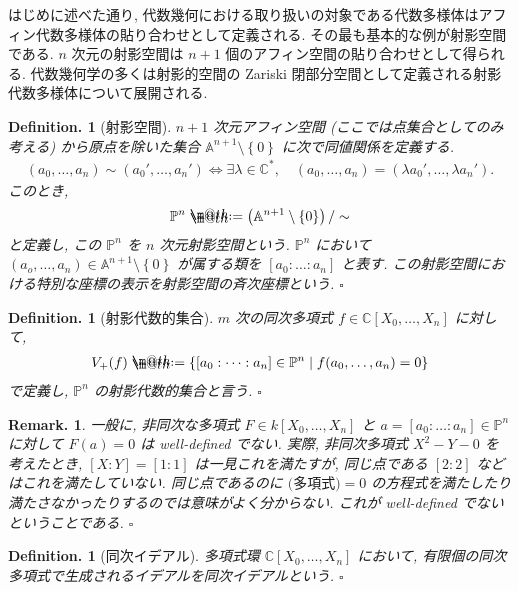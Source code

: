 \documentclass[openany, a4paper, oneside]{jsbook}
\makeatletter
\newcommand*{\defeq}{\mathrel{\rlap{%
\raisebox{0.3ex}{$\m@th\cdot$}}%
\raisebox{-0.3ex}{$\m@th\cdot$}}%
=}
\theoremstyle{break}
\theoremstyle{breakdefn}
\newtheorem{defn}[thm]{Definition.}
\newtheorem{rem}[thm]{Remark.}
\newcommand{\rbk}[1]{\left (#1\right)}
\newcommand{\cbk}[1]{\left\{#1\right\}}
\newcommand{\relmiddle}[1]{\mathrel{}\middle#1\mathrel{}}
\newcommand{\set}[2]{\left\{#1 \relmiddle| #2\right\}}
\newcommand{\fin}{\hfill $\square$ \par}
\makeatother
\begin{document}
はじめに述べた通り, 代数幾何における取り扱いの対象である代数多様体はアフィン代数多様体の貼り合わせとして定義される.
その最も基本的な例が射影空間である.
$n$ 次元の射影空間は $n+1$ 個のアフィン空間の貼り合わせとして得られる.
代数幾何学の多くは射影的空間の Zariski 閉部分空間として定義される射影代数多様体について展開される.
\begin{defn}[射影空間]\label{waheyhey-algebraic-geometry-guidance7}
$n+1$ 次元アフィン空間 (ここでは点集合としてのみ考える) から原点を除いた集合 $\mathbb{A}^{n+1} \setminus \cbk{0}$ に次で同値関係を定義する.
\begin{align}
 (a_0, \dots, a_n)
 \sim
 ( { a_0 }', \dots, { a_n }' )
 \Leftrightarrow
 \exists \lambda \in \mathbb{C}^*, \quad
 (a_0, \dots, a_n)
 =
 ( \lambda { a_0 }', \dots, \lambda { a_n }' ).
\end{align}
このとき,
\begin{align}
 \mathbb{P}^n
 \defeq
 \rbk{\mathbb{A}^{n+1} \setminus \cbk{0}} / \sim
\end{align}
と定義し, この $\mathbb{P}^n$ を $n$ 次元射影空間という.
$\mathbb{P}^n$ において $(a_o, \dots, a_n) \in \mathbb{A}^{n+1} \setminus \cbk{0}$ が属する類を
$[a_0 : \dots : a_n]$ と表す.
この射影空間における特別な座標の表示を射影空間の斉次座標という. \fin
\end{defn}
\begin{defn}[射影代数的集合]
$m$ 次の同次多項式 $f \in \mathbb{C}[X_0, \dots, X_n]$ に対して,
\begin{align}
 V_+ ( f )
 \defeq
 \set{[a_0 : \dots : a_n] \in \mathbb{P}^n}{f ( a_0, \dots, a_n ) = 0}
\end{align}
で定義し,  $\mathbb{P}^n$ の射影代数的集合と言う. \fin
\end{defn}
\begin{rem}
一般に, 非同次な多項式 $F \in k[X_0, \dots, X_n]$ と
$a=[a_0: \dots : a_n] \in \mathbb{P}^n$ に対して $F (a)=0$ は well-defined でない.
実際, 非同次多項式 $X^2-Y-0$ を考えたとき,
$[X:Y]=[1:1]$ は一見これを満たすが, 同じ点である $[2:2]$ などはこれを満たしていない.
同じ点であるのに $\text{(多項式)}=0$ の方程式を満たしたり満たさなかったりするのでは意味がよく分からない.
これが well-defined でないということである. \fin
\end{rem}

\begin{defn}[同次イデアル]
多項式環 $\mathbb{C}[X_0, \dots, X_n]$ において,
有限個の同次多項式で生成されるイデアルを同次イデアルという. \fin
\end{defn}
\end{document}
